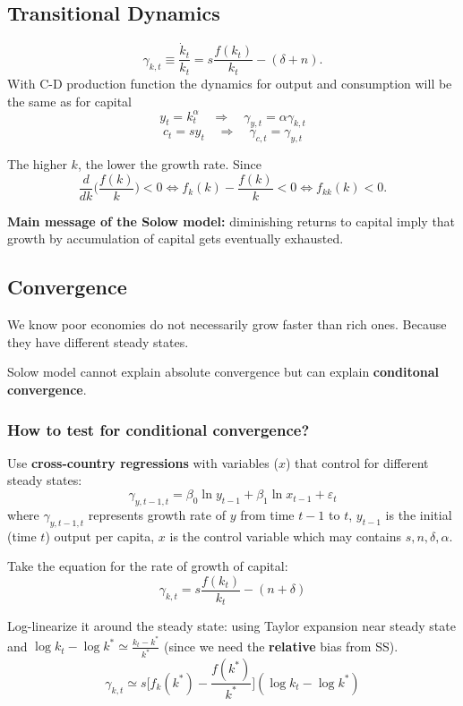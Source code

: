 \subsection{Transitional Dynamics}
\[
    \gamma_{k,t} \equiv \frac{\dot{k}_t}{k_t} = s \frac{f(k_t)}{k_t} - (\delta + n).
\]
With C-D production function the dynamics for output and consumption will be the same as for capital \[
    y_t = k_t^\alpha \quad\Longrightarrow \quad\gamma_{y,t} = \alpha\gamma_{k,t}
\]\[
    c_t = sy_t \quad \Longrightarrow \quad\gamma_{c,t} = \gamma_{y,t}
\]

The higher $k$, the lower the growth rate. Since \[
    \frac{d}{dk}\Big(\frac{f(k)}{k}\Big) < 0 \iff f_k(k) - \frac{f(k)}{k} < 0 \iff f_{kk}(k)<0.
\]

\textbf{Main message of the Solow model:} diminishing returns to capital imply that growth by accumulation of capital gets eventually exhausted.


\subsection{Convergence}

We know poor economies do not necessarily grow faster than rich ones. Because they have different steady states.

Solow model cannot explain absolute convergence but can explain \textbf{conditonal convergence}.

\subsubsection{How to test for conditional convergence?}

Use \textbf{cross-country regressions} with variables ($x$) that control for different steady states: \[
    \gamma_{y,t-1,t} = \beta_0\ln y_{t-1} + \beta_1\ln x_{t-1} + \varepsilon_t
\] where $\gamma_{y,t-1,t}$ represents growth rate of $y$ from time $t-1$ to $t$, $y_{t-1}$ is the initial (time $t$) output per capita, $x$ is the control variable which may contains $s, n, \delta, \alpha$.

Take the equation for the rate of growth of capital: \[
    \gamma_{k,t} = s \frac{f(k_t)}{k_t} - (n + \delta)
\]

Log-linearize it around the steady state: using Taylor expansion near steady state and $\log k_t - \log k^* \simeq \frac{k_t - k^*}{k^*}$ (since we need the \textbf{relative} bias from SS). \[
    \gamma_{k,t} \simeq s\Big[f_k(k^*) - \frac{f(k^*)}{k^*}\Big](\log k_t - \log k^*)
\]

